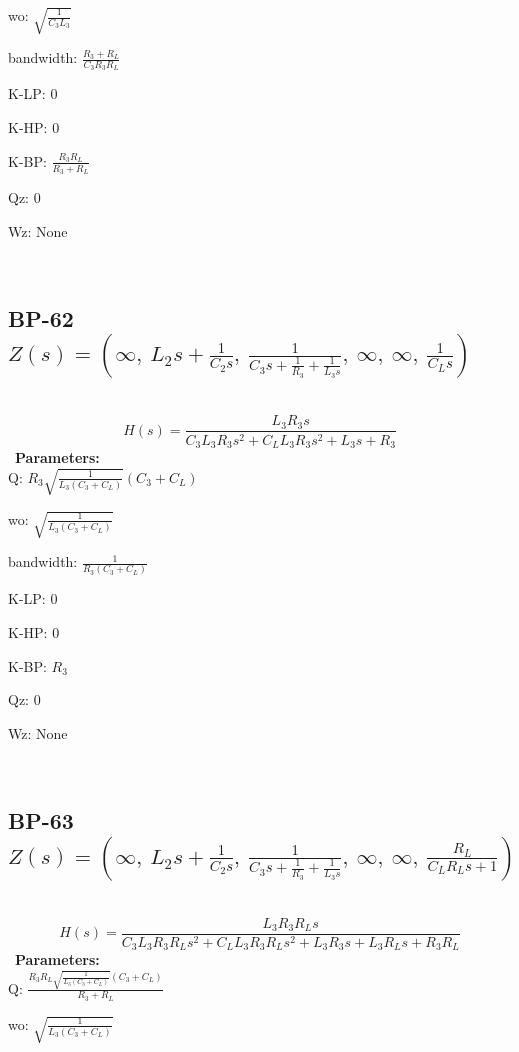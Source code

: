 \documentclass{article}
\begin{document}
wo: $\sqrt{\frac{1}{C_{3} L_{3}}}$\ 

bandwidth: $\frac{R_{3} + R_{L}}{C_{3} R_{3} R_{L}}$\ 

K-LP: $0$\ 

K-HP: $0$\ 

K-BP: $\frac{R_{3} R_{L}}{R_{3} + R_{L}}$\ 

Qz: $0$\ 

Wz: $\text{None}$\ 

\ 

\subsection{BP-62 $Z(s) = \left( \infty, \  L_{2} s + \frac{1}{C_{2} s}, \  \frac{1}{C_{3} s + \frac{1}{R_{3}} + \frac{1}{L_{3} s}}, \  \infty, \  \infty, \  \frac{1}{C_{L} s}\right)$ } \ 
\textbf{\[H(s) = \frac{L_{3} R_{3} s}{C_{3} L_{3} R_{3} s^{2} + C_{L} L_{3} R_{3} s^{2} + L_{3} s + R_{3}}\] } \ 
\textbf{Parameters:}\\ 

Q: $R_{3} \sqrt{\frac{1}{L_{3} \left(C_{3} + C_{L}\right)}} \left(C_{3} + C_{L}\right)$\ 

wo: $\sqrt{\frac{1}{L_{3} \left(C_{3} + C_{L}\right)}}$\ 

bandwidth: $\frac{1}{R_{3} \left(C_{3} + C_{L}\right)}$\ 

K-LP: $0$\ 

K-HP: $0$\ 

K-BP: $R_{3}$\ 

Qz: $0$\ 

Wz: $\text{None}$\ 

\ 

\subsection{BP-63 $Z(s) = \left( \infty, \  L_{2} s + \frac{1}{C_{2} s}, \  \frac{1}{C_{3} s + \frac{1}{R_{3}} + \frac{1}{L_{3} s}}, \  \infty, \  \infty, \  \frac{R_{L}}{C_{L} R_{L} s + 1}\right)$ } \ 
\textbf{\[H(s) = \frac{L_{3} R_{3} R_{L} s}{C_{3} L_{3} R_{3} R_{L} s^{2} + C_{L} L_{3} R_{3} R_{L} s^{2} + L_{3} R_{3} s + L_{3} R_{L} s + R_{3} R_{L}}\] } \ 
\textbf{Parameters:}\\ 

Q: $\frac{R_{3} R_{L} \sqrt{\frac{1}{L_{3} \left(C_{3} + C_{L}\right)}} \left(C_{3} + C_{L}\right)}{R_{3} + R_{L}}$\ 

wo: $\sqrt{\frac{1}{L_{3} \left(C_{3} + C_{L}\right)}}$\ 
\end{document}
